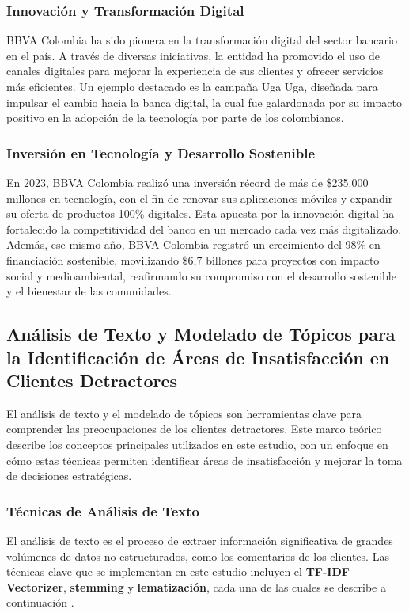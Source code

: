 \documentclass{matematicasud}
\begin{document}
\subsubsection{Innovación y Transformación Digital}
BBVA Colombia ha sido pionera en la transformación digital del sector bancario en el país. A través de diversas iniciativas, la entidad ha promovido el uso de canales digitales para mejorar la experiencia de sus clientes y ofrecer servicios más eficientes. Un ejemplo destacado es la campaña Uga Uga, diseñada para impulsar el cambio hacia la banca digital, la cual fue galardonada por su impacto positivo en la adopción de la tecnología por parte de los colombianos. \cite{3}

\subsubsection{Inversión en Tecnología y Desarrollo Sostenible}
En 2023, BBVA Colombia realizó una inversión récord de más de \$235.000 millones en tecnología, con el fin de renovar sus aplicaciones móviles y expandir su oferta de productos 100\% digitales. Esta apuesta por la innovación digital ha fortalecido la competitividad del banco en un mercado cada vez más digitalizado. Además, ese mismo año, BBVA Colombia registró un crecimiento del 98\% en financiación sostenible, movilizando \$6,7 billones para proyectos con impacto social y medioambiental, reafirmando su compromiso con el desarrollo sostenible y el bienestar de las comunidades. \cite{4}


\subsection{Análisis de Texto y Modelado de Tópicos para la Identificación de Áreas de Insatisfacción en Clientes Detractores}
El análisis de texto y el modelado de tópicos son herramientas clave para comprender las preocupaciones de los clientes detractores. Este marco teórico describe los conceptos principales utilizados en este estudio, con un enfoque en cómo estas técnicas permiten identificar áreas de insatisfacción y mejorar la toma de decisiones estratégicas.

\subsubsection{Técnicas de Análisis de Texto}

El análisis de texto es el proceso de extraer información significativa de grandes volúmenes de datos no estructurados, como los comentarios de los clientes. Las técnicas clave que se implementan en este estudio incluyen el \textbf{TF-IDF Vectorizer}, \textbf{stemming} y \textbf{lematización}, cada una de las cuales se describe a continuación \cite{8}.
\end{document}
